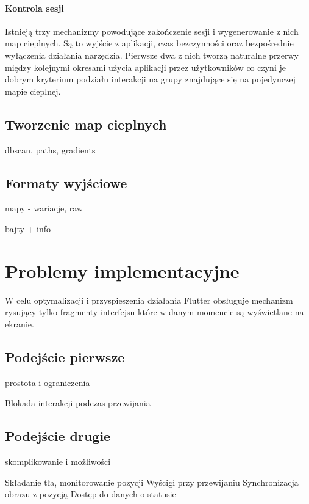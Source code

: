 \paragraph{Kontrola sesji}
Istnieją trzy mechanizmy powodujące zakończenie sesji i wygenerowanie z nich map cieplnych. Są to wyjście z aplikacji, czas bezczynności oraz bezpośrednie wyłączenia działania narzędzia. Pierwsze dwa z nich tworzą naturalne przerwy między kolejnymi okresami użycia aplikacji przez użytkowników co czyni je dobrym kryterium podziału interakcji na grupy znajdujące się na pojedynczej mapie cieplnej.

\subsection{Tworzenie map cieplnych}
dbscan, paths, gradients

\subsection{Formaty wyjściowe}
mapy - wariacje, raw

bajty + info

\section{Problemy implementacyjne}
W celu optymalizacji i przyspieszenia działania Flutter obsługuje mechanizm rysujący tylko fragmenty interfejsu które w danym momencie są wyświetlane na ekranie.

\subsection{Podejście pierwsze}
prostota i ograniczenia

Blokada interakcji podczas przewijania

\subsection{Podejście drugie}
skomplikowanie i możliwości

Składanie tła, monitorowanie pozycji
Wyścigi przy przewijaniu
Synchronizacja obrazu z pozycją
Dostęp do danych o statusie
